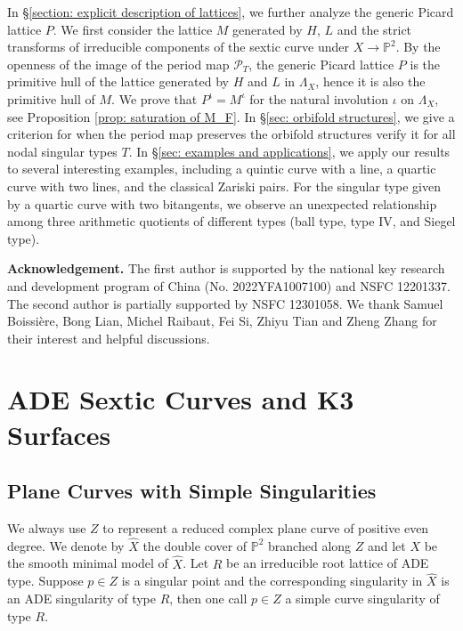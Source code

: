 \documentclass[
]{article}
\begin{document}
In §\ref{section: explicit description of lattices}, we further analyze
the generic Picard lattice \(P\). We first consider the lattice \(M\)
generated by \(H\), \(L\) and the strict transforms of irreducible
components of the sextic curve under \(X\to \mathbb{P}^2\). By the
openness of the image of the period map \(\mathscr{P}_T\), the generic
Picard lattice \(P\) is the primitive hull of the lattice generated by
\(H\) and \(L\) in \(\Lambda_X\), hence it is also the primitive hull of
\(M\). We prove that \(P^\iota=M^\iota\) for the natural involution
\(\iota\) on \(\Lambda_X\), see Proposition
\ref{prop: saturation of M_F}. In §\ref{sec: orbifold structures}, we
give a criterion for when the period map preserves the orbifold
structures verify it for all nodal singular types \(T\). In
§\ref{sec: examples and applications}, we apply our results to several
interesting examples, including a quintic curve with a line, a quartic
curve with two lines, and the classical Zariski pairs. For the singular
type given by a quartic curve with two bitangents, we observe an
unexpected relationship among three arithmetic quotients of different
types (ball type, type IV, and Siegel type).

\textbf{Acknowledgement.} The first author is supported by the national
key research and development program of China (No. 2022YFA1007100) and
NSFC 12201337. The second author is partially supported by NSFC
12301058. We thank Samuel Boissière, Bong Lian, Michel Raibaut, Fei Si,
Zhiyu Tian and Zheng Zhang for their interest and helpful discussions.

\section{ADE Sextic Curves and K3 Surfaces}\label{section:ux20K3}

\subsection{Plane Curves with Simple
Singularities}\label{subsection:ux20ADEux20sextic}

We always use \(Z\) to represent a reduced complex plane curve of
positive even degree. We denote by \(\widehat{X}\) the double cover of
\(\mathbb{P}^2\) branched along \(Z\) and let \(X\) be the smooth
minimal model of \(\widehat{X}\). Let \(R\) be an irreducible root
lattice of ADE type. Suppose \(p\in Z\) is a singular point and the
corresponding singularity in \(\widehat{X}\) is an ADE singularity of
type \(R\), then one call \(p\in Z\) a simple curve singularity of type
\(R\).
\end{document}
